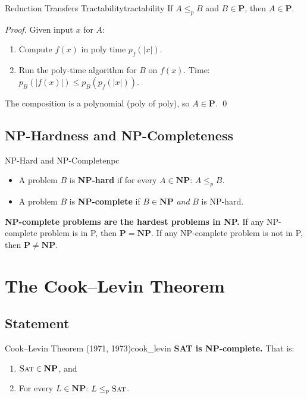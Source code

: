 \documentclass[12pt,a4paper]{article}
\newcommand{\P}{\mathbf{P}}
\newcommand{\NP}{\mathbf{NP}}
\newcommand{\SAT}{\textsc{Sat}}
\newcommand{\leqp}{\leq_p}
\begin{document}
\begin{theorem}{Reduction Transfers Tractability}{tractability}
If $A \leqp B$ and $B \in \P$, then $A \in \P$.
\end{theorem}

\begin{proof}
Given input $x$ for $A$:
\begin{enumerate}[leftmargin=2em]
  \item Compute $f(x)$ in poly time $p_f(|x|)$.
  \item Run the poly-time algorithm for $B$ on $f(x)$. Time: $p_B(|f(x)|) \leq p_B(p_f(|x|))$.
\end{enumerate}
The composition is a polynomial (poly of poly), so $A \in \P$. \qed
\end{proof}

\subsection{NP-Hardness and NP-Completeness}

\begin{definition}{NP-Hard and NP-Complete}{npc}
\begin{itemize}[leftmargin=2em]
  \item A problem $B$ is \textbf{NP-hard} if for every $A \in \NP$: $A \leqp B$.
  \item A problem $B$ is \textbf{NP-complete} if $B \in \NP$ \emph{and} $B$ is NP-hard.
\end{itemize}
\end{definition}

\begin{keyidea}
\textbf{NP-complete problems are the hardest problems in NP.} If any NP-complete problem 
is in P, then $\P = \NP$. If any NP-complete problem is not in P, then $\P \neq \NP$.
\end{keyidea}

\newpage

\section{The Cook--Levin Theorem}

\subsection{Statement}

\begin{theorem}{Cook--Levin Theorem (1971, 1973)}{cook_levin}
\textbf{SAT is NP-complete.} That is:
\begin{enumerate}[leftmargin=2em]
  \item $\SAT \in \NP$, and
  \item For every $L \in \NP$: $L \leqp \SAT$.
\end{enumerate}
\end{theorem}
\end{document}
